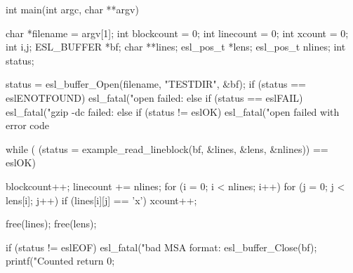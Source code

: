 \begin{cchunk}
int
main(int argc, char **argv)
{
  char       *filename = argv[1];
  int         blockcount = 0;
  int         linecount  = 0;
  int         xcount     = 0;
  int         i,j;
  ESL_BUFFER *bf;
  char      **lines;
  esl_pos_t  *lens;
  esl_pos_t   nlines;
  int         status;

  status = esl_buffer_Open(filename, "TESTDIR", &bf);
  if      (status == eslENOTFOUND) esl_fatal("open failed: %
  else if (status == eslFAIL)      esl_fatal("gzip -dc failed: %
  else if (status != eslOK)        esl_fatal("open failed with error code %

  while ( (status = example_read_lineblock(bf, &lines, &lens, &nlines)) == eslOK)
    {
      blockcount++;
      linecount += nlines;
      for (i = 0; i < nlines; i++)
	for (j = 0; j < lens[i]; j++) 
	  if (lines[i][j] == 'x') xcount++;

      free(lines);
      free(lens);
    }
  if (status != eslEOF) esl_fatal("bad MSA format: %
  esl_buffer_Close(bf);
  printf("Counted %
  return 0;
}
\end{cchunk}
